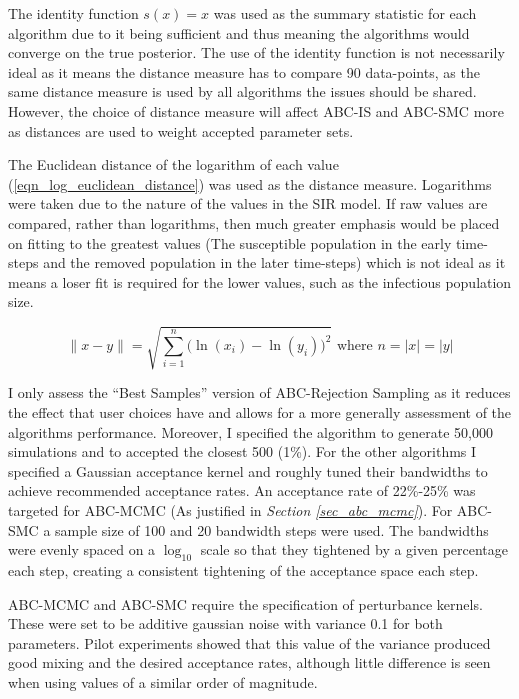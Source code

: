 \documentclass[11pt,a4paper]{article}
\theoremstyle{break}
\begin{document}
  \par The identity function $s(x)=x$ was used as the summary statistic for each algorithm due to it being sufficient and thus meaning the algorithms would converge on the true posterior. The use of the identity function is not necessarily ideal as it means the distance measure has to compare 90 data-points, as the same distance measure is used by all algorithms the issues should be shared. However, the choice of distance measure will affect ABC-IS and ABC-SMC more as distances are used to weight accepted parameter sets.

  \par The Euclidean distance of the logarithm of each value (\ref{eqn_log_euclidean_distance}) was used as the distance measure. Logarithms were taken due to the nature of the values in the SIR model. If raw values are compared, rather than logarithms, then much greater emphasis would be placed on fitting to the greatest values (The susceptible population in the early time-steps and the removed population in the later time-steps) which is not ideal as it means a loser fit is required for the lower values, such as the infectious population size.

  \begin{equation}\label{eqn_log_euclidean_distance}
    \|x-y\|=\sqrt{\sum_{i=1}^n\big(\ln(x_i)-\ln(y_i)\big)^2}\text{ where }n=|x|=|y|
  \end{equation}

  \par I only assess the ``Best Samples'' version of ABC-Rejection Sampling as it reduces the effect that user choices have and allows for a more generally assessment of the algorithms performance. Moreover, I specified the algorithm to generate 50,000 simulations and to accepted the closest 500 (1\%). For the other algorithms I specified a Gaussian acceptance kernel and roughly tuned their bandwidths to achieve recommended acceptance rates. An acceptance rate of 22\%-25\% was targeted for ABC-MCMC (As justified in \textit{Section \ref{sec_abc_mcmc}}). For ABC-SMC a sample size of 100 and 20 bandwidth steps were used. The bandwidths were evenly spaced on a $\log_10$ scale so that they tightened by a given percentage each step, creating a consistent tightening of the acceptance space each step.

  \par ABC-MCMC and ABC-SMC require the specification of perturbance kernels. These were set to be additive gaussian noise with variance 0.1 for both parameters. Pilot experiments showed that this value of the variance produced good mixing and the desired acceptance rates, although little difference is seen when using values of a similar order of magnitude.
\end{document}
